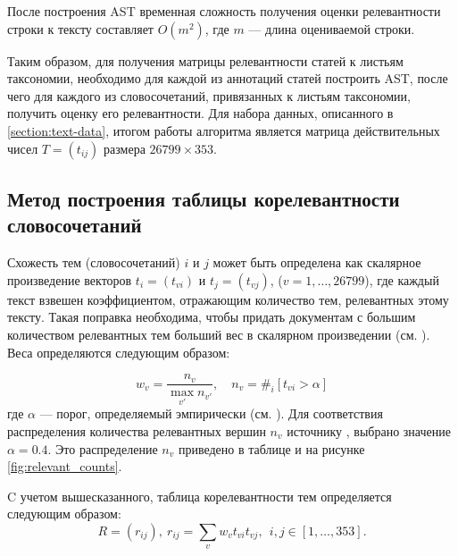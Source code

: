 \documentclass[12pt]{article}
\let\oldsubsection\subsection
\renewcommand{\subsection}{\clearpage\oldsubsection}
\begin{document}
После построения AST временная сложность получения оценки релевантности строки к тексту составляет $O(m^2)$, где $m$ --- длина оцениваемой строки.

Таким образом, для получения матрицы релевантности статей к листьям таксономии, необходимо для каждой из аннотаций статей построить AST, после чего для каждого из словосочетаний, привязанных к листьям таксономии, получить оценку его релевантности. Для набора данных, описанного в \ref{section:text-data}, итогом работы алгоритма является матрица действительных чисел $T=(t_{ij})$ размера $26799 \times 353$.


\subsection{Метод построения таблицы корелевантности словосочетаний}

Схожесть тем (словосочетаний) $i$ и $j$ может быть определена как скалярное произведение векторов $t_i=(t_{vi})$ и $t_j=(t_{vj})$, ($v=1,\ldots,26799$), где каждый текст взвешен коэффициентом, отражающим количество тем, релевантных этому тексту. Такая поправка необходима, чтобы придать документам с большим количеством релевантных тем больший вес в скалярном произведении (см. \cite{mirkin2010constructing}). Веса определяются следующим образом:

\begin{equation}
		w_{v} = \frac{n_v}{\max_{v'} n_{v'}}, \quad n_v = \#_i[t_{vi} > \alpha]
	\label{eq:rel_wt}
\end{equation}
где $\alpha$ --- порог, определяемый эмпирически (см. \cite{Chernyak_2015}). Для соответствия распределения количества релевантных вершин $n_v$ источнику \cite{mirkin2018preprint}, выбрано значение $\alpha=0.4$. Это распределение $n_v$ приведено в таблице и на рисунке \ref{fig:relevant_counts}.

C учетом вышесказанного, таблица корелевантности тем определяется следующим образом:
\begin{equation}
	R = (r_{ij}), \   r_{ij} = \sum_{v} w_{v} t_{vi} t_{vj}, \ \ i,j\in[1,\ldots, 353].
	\label{eq:rel}
\end{equation}
\end{document}
